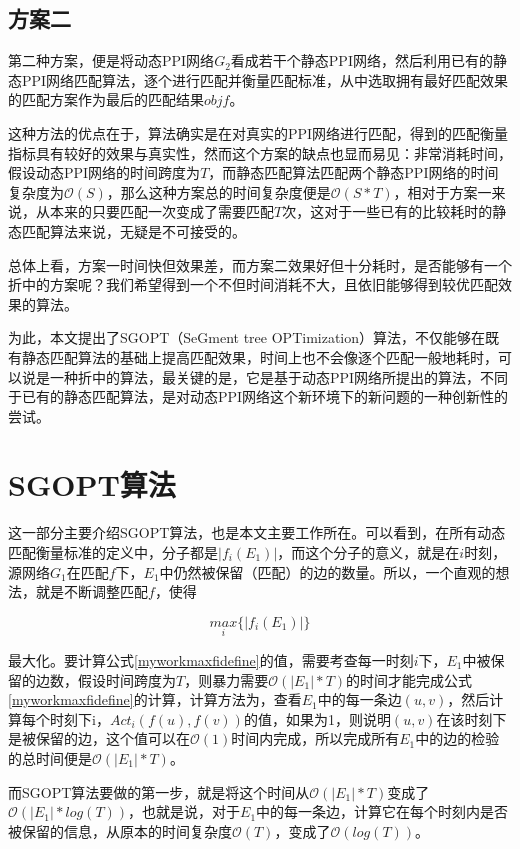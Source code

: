 \subsection{方案二}
第二种方案，便是将动态PPI网络$G_2$看成若干个静态PPI网络，然后利用已有的静态PPI网络匹配算法，逐个进行匹配并衡量匹配标准，从中选取拥有最好匹配效果的匹配方案作为最后的匹配结果$objf$。

这种方法的优点在于，算法确实是在对真实的PPI网络进行匹配，得到的匹配衡量指标具有较好的效果与真实性，然而这个方案的缺点也显而易见：非常消耗时间，假设动态PPI网络的时间跨度为$T$，而静态匹配算法匹配两个静态PPI网络的时间复杂度为$\mathcal{O}(S)$，那么这种方案总的时间复杂度便是$\mathcal{O}(S*T)$，相对于方案一来说，从本来的只要匹配一次变成了需要匹配$T$次，这对于一些已有的比较耗时的静态匹配算法来说，无疑是不可接受的。

总体上看，方案一时间快但效果差，而方案二效果好但十分耗时，是否能够有一个折中的方案呢？我们希望得到一个不但时间消耗不大，且依旧能够得到较优匹配效果的算法。

为此，本文提出了SGOPT（SeGment tree OPTimization）算法，不仅能够在既有静态匹配算法的基础上提高匹配效果，时间上也不会像逐个匹配一般地耗时，可以说是一种折中的算法，最关键的是，它是基于动态PPI网络所提出的算法，不同于已有的静态匹配算法，是对动态PPI网络这个新环境下的新问题的一种创新性的尝试。
\section{SGOPT算法}
这一部分主要介绍SGOPT算法，也是本文主要工作所在。可以看到，在所有动态匹配衡量标准的定义中，分子都是$|f_i(E_1)|$，而这个分子的意义，就是在$i$时刻，源网络$G_1$在匹配$f$下，$E_1$中仍然被保留（匹配）的边的数量。所以，一个直观的想法，就是不断调整匹配$f$，使得

\begin{equation}\label{myworkmaxfidefine}    
\underset{i}{max}\{ |f_i(E_1)|\}
\end{equation}

最大化。要计算公式\ref{myworkmaxfidefine}的值，需要考查每一时刻$i$下，$E_1$中被保留的边数，假设时间跨度为$T$，则暴力需要$\mathcal{O}(|E_1|*T)$的时间才能完成公式\ref{myworkmaxfidefine}的计算，计算方法为，查看$E_1$中的每一条边$(u,v)$，然后计算每个时刻下i，$Act_i(f(u),f(v))$的值，如果为1，则说明$(u,v)$在该时刻下是被保留的边，这个值可以在$\mathcal{O}(1)$时间内完成，所以完成所有$E_1$中的边的检验的总时间便是$\mathcal{O}(|E_1|*T)$。

而SGOPT算法要做的第一步，就是将这个时间从$\mathcal{O}(|E_1|*T)$变成了$\mathcal{O}(|E_1|*log(T))$，也就是说，对于$E_1$中的每一条边，计算它在每个时刻内是否被保留的信息，从原本的时间复杂度$\mathcal{O}(T)$，变成了$\mathcal{O}(log(T))$。

